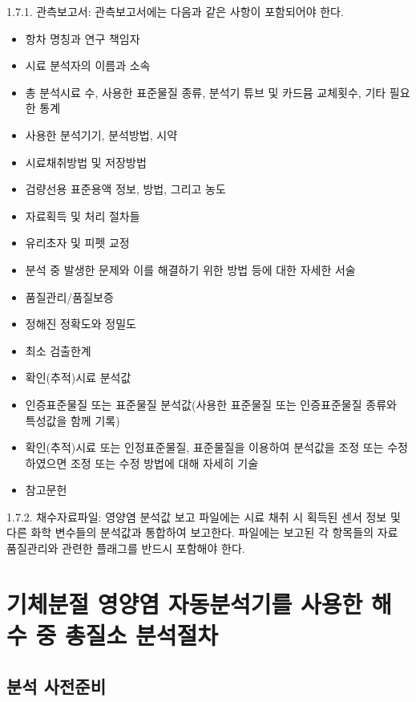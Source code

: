 \documentclass[
]{book}
\providecommand{\tightlist}{%
  \setlength{\itemsep}{0pt}\setlength{\parskip}{0pt}}
\begin{document}
1.7.1. 관측보고서: 관측보고서에는 다음과 같은 사항이 포함되어야 한다.

\begin{itemize}
\tightlist
\item
  항차 명칭과 연구 책임자
\item
  시료 분석자의 이름과 소속
\item
  총 분석시료 수, 사용한 표준물질 종류, 분석기 튜브 및 카드뮴 교체횟수, 기타 필요한 통계
\item
  사용한 분석기기, 분석방법, 시약
\item
  시료채취방법 및 저장방법
\item
  검량선용 표준용액 정보, 방법, 그리고 농도
\item
  자료획득 및 처리 절차들
\item
  유리초자 및 피펫 교정
\item
  분석 중 발생한 문제와 이를 해결하기 위한 방법 등에 대한 자세한 서술
\item
  품질관리/품질보증
\item
  정해진 정확도와 정밀도
\item
  최소 검출한계
\item
  확인(추적)시료 분석값
\item
  인증표준물질 또는 표준물질 분석값(사용한 표준물질 또는 인증표준물질 종류와 특성값을 함께 기록)
\item
  확인(추적)시료 또는 인정표준물질, 표준물질을 이용하여 분석값을 조정 또는 수정하였으면 조정 또는 수정 방법에 대해 자세히 기술
\item
  참고문헌
\end{itemize}

1.7.2. 채수자료파일: 영양염 분석값 보고 파일에는 시료 채취 시 획득된 센서 정보 및 다른 화학 변수들의 분석값과 통합하여 보고한다. 파일에는 보고된 각 항목들의 자료 품질관리와 관련한 플래그를 반드시 포함해야 한다.

\hypertarget{uxae30uxccb4uxbd84uxc808-uxc601uxc591uxc5fc-uxc790uxb3d9uxbd84uxc11duxae30uxb97c-uxc0acuxc6a9uxd55c-uxd574uxc218-uxc911-uxcd1duxc9c8uxc18c-uxbd84uxc11duxc808uxcc28}{%
\section{기체분절 영양염 자동분석기를 사용한 해수 중 총질소 분석절차}\label{uxae30uxccb4uxbd84uxc808-uxc601uxc591uxc5fc-uxc790uxb3d9uxbd84uxc11duxae30uxb97c-uxc0acuxc6a9uxd55c-uxd574uxc218-uxc911-uxcd1duxc9c8uxc18c-uxbd84uxc11duxc808uxcc28}}

\hypertarget{uxbd84uxc11d-uxc0acuxc804uxc900uxbe44-1}{%
\subsection{분석 사전준비}\label{uxbd84uxc11d-uxc0acuxc804uxc900uxbe44-1}}
\end{document}
